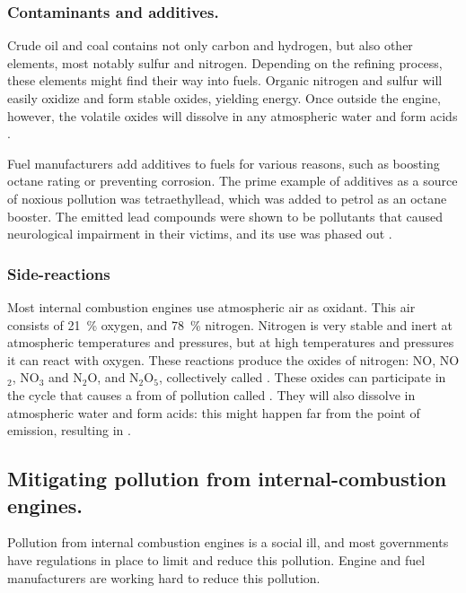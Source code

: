 \subsubsection{Contaminants and additives.}

Crude oil and coal contains not only carbon and hydrogen, but also other
elements, most notably sulfur and nitrogen. Depending on the refining process,
these elements might find their way into fuels. Organic nitrogen and sulfur will
easily oxidize and form stable oxides, yielding energy. Once outside the engine,
however, the volatile oxides will dissolve in any atmospheric water and form
acids \autocite{Duncan2016}.

Fuel manufacturers add additives to fuels for various reasons, such as boosting
octane rating or preventing corrosion. The prime example of additives as a
source of noxious pollution was tetraethyllead, which was added to petrol as an
octane booster. The emitted lead compounds were shown to be pollutants that
caused neurological impairment in their victims, and its use was phased out
\autocite{Needleman2000}.	

\subsubsection{Side-reactions}

Most internal combustion engines use atmospheric air as oxidant. This air
consists of \SI{21}{\percent} oxygen, and \SI{78}{\percent} nitrogen. Nitrogen
is very stable and inert at atmospheric temperatures and pressures, but at high
temperatures and pressures it can react with oxygen. These reactions produce the
oxides of nitrogen: NO, NO$_2$, NO$_3$ and N$_2$O, and N$_2$O$_5$, collectively
called \nox. These oxides can participate in the cycle that causes a from of
pollution called . They will also dissolve in
atmospheric water and form acids: this might happen far from the point of
emission, resulting in .

\subsection{Mitigating pollution from internal\hyp{}combustion engines.}
 
Pollution from internal combustion engines is a social ill, and most governments
have regulations in place to limit and reduce this pollution. Engine and fuel
manufacturers are working hard to reduce this pollution.

